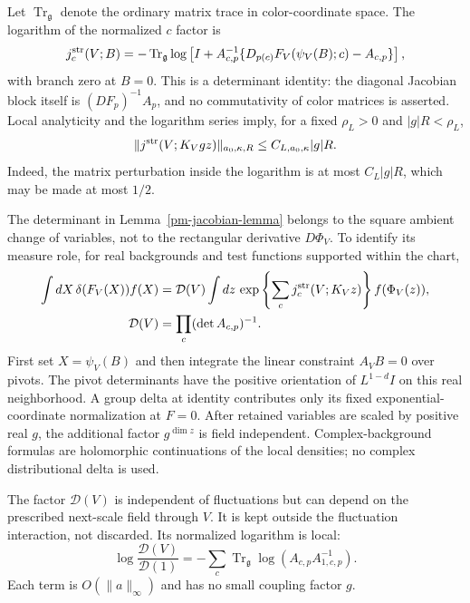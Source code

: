 \documentclass[11pt]{article}
\theoremstyle{remark}
\begin{document}
Let $\operatorname{Tr}_{\mathfrak g}$ denote the ordinary
matrix trace in color-coordinate space. The logarithm of the
normalized $c$ factor is
\begin{equation}\label{pm-jacobian-log}
 j_c^{\rm str}(V;B)=
 -\operatorname{Tr}_{\mathfrak g}\log\left[
 I+A_{c,p}^{-1}
 \{D_{p(c)}F_V(\psi_V(B);c)-A_{c,p}\}\right],
\end{equation}
with branch zero at $B=0$. This is a determinant identity:
the diagonal Jacobian block itself is $(DF_p)^{-1}A_p$,
and no commutativity of color matrices is asserted.
Local analyticity and the logarithm series imply, for a fixed
$\rho_L>0$ and $|g|R<\rho_L$,
\begin{equation}\label{pm-jacobian-bound}
 \|j^{\rm str}(V;K_Vgz)\|_{a_0,\kappa,R}
 \le C_{L,a_0,\kappa}|g|R.
\end{equation}
Indeed, the matrix perturbation inside the logarithm is at
most $C_L|g|R$, which may be made at most $1/2$.

The determinant in Lemma~\ref{pm-jacobian-lemma} belongs to
the square ambient change of variables, not to the rectangular
derivative $D\Phi_V$. To identify its measure role, for real
backgrounds and test functions supported within the chart,
\begin{equation}\label{pm-delta-reduction}
 \begin{split}
 \int dX\,\delta(F_V(X))f(X)
 &=\mathcal D(V)\int dz\,
 \exp\left\{\sum_cj_c^{\rm str}(V;K_Vz)\right\}
 f(\Phi_V(z)),\\
 \mathcal D(V)&=\prod_c(\det A_{c,p})^{-1}.
 \end{split}
\end{equation}
First set $X=\psi_V(B)$ and then integrate the linear
constraint $A_VB=0$ over pivots. The pivot determinants have
the positive orientation of $L^{1-d}I$ on this real
neighborhood. A group delta at identity contributes only its
fixed exponential-coordinate normalization at $F=0$.
After retained variables are scaled by positive real $g$,
the additional factor $g^{\dim z}$ is field independent.
Complex-background formulas are holomorphic continuations
of the local densities; no complex distributional delta is used.

The factor $\mathcal D(V)$ is independent of fluctuations
but can depend on the prescribed next-scale field through $V$.
It is kept outside the fluctuation interaction, not discarded.
Its normalized logarithm is local:
\begin{equation}\label{pm-background-determinant}
 \log\frac{\mathcal D(V)}{\mathcal D(1)}
 =-\sum_c\operatorname{Tr}_{\mathfrak g}
       \log(A_{c,p}A_{1,c,p}^{-1}).
\end{equation}
Each term is $O(\|a\|_\infty)$ and has no small coupling
factor $g$.
\end{document}
